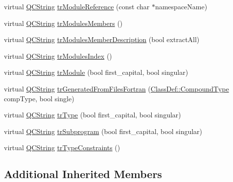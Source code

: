 \begin{DoxyCompactItemize}
\item 
virtual \mbox{\hyperlink{class_q_c_string}{Q\+C\+String}} \mbox{\hyperlink{class_translator_serbian_cyrillic_aee6e0a49dafe54960c2dbc685cb33f60}{tr\+Module\+Reference}} (const char $\ast$namespace\+Name)
\item 
virtual \mbox{\hyperlink{class_q_c_string}{Q\+C\+String}} \mbox{\hyperlink{class_translator_serbian_cyrillic_a4fc476f9d39e2a14d5dad2b1345ae1b1}{tr\+Modules\+Members}} ()
\item 
virtual \mbox{\hyperlink{class_q_c_string}{Q\+C\+String}} \mbox{\hyperlink{class_translator_serbian_cyrillic_a279c81aec7983e15a7917c000887a4ae}{tr\+Modules\+Member\+Description}} (bool extract\+All)
\item 
virtual \mbox{\hyperlink{class_q_c_string}{Q\+C\+String}} \mbox{\hyperlink{class_translator_serbian_cyrillic_aff7ed71b249065cac36f566467eb1cbb}{tr\+Modules\+Index}} ()
\item 
virtual \mbox{\hyperlink{class_q_c_string}{Q\+C\+String}} \mbox{\hyperlink{class_translator_serbian_cyrillic_a4bbc03d2bfbed6422b0737833d840d5e}{tr\+Module}} (bool first\+\_\+capital, bool singular)
\item 
virtual \mbox{\hyperlink{class_q_c_string}{Q\+C\+String}} \mbox{\hyperlink{class_translator_serbian_cyrillic_a5b2a691e024bc52e605ba86655d13500}{tr\+Generated\+From\+Files\+Fortran}} (\mbox{\hyperlink{class_class_def_ae70cf86d35fe954a94c566fbcfc87939}{Class\+Def\+::\+Compound\+Type}} comp\+Type, bool single)
\item 
virtual \mbox{\hyperlink{class_q_c_string}{Q\+C\+String}} \mbox{\hyperlink{class_translator_serbian_cyrillic_ae4ba0340508549f9ae7710327bc889f7}{tr\+Type}} (bool first\+\_\+capital, bool singular)
\item 
virtual \mbox{\hyperlink{class_q_c_string}{Q\+C\+String}} \mbox{\hyperlink{class_translator_serbian_cyrillic_a53faf51c1508a37733276e401ac80f79}{tr\+Subprogram}} (bool first\+\_\+capital, bool singular)
\item 
virtual \mbox{\hyperlink{class_q_c_string}{Q\+C\+String}} \mbox{\hyperlink{class_translator_serbian_cyrillic_ace146e018cda2988db635d61e61646c0}{tr\+Type\+Constraints}} ()
\end{DoxyCompactItemize}
\subsection*{Additional Inherited Members}



